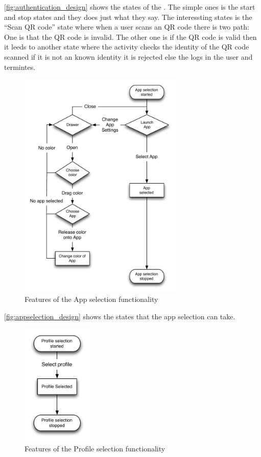 \autoref{fig:authentication_design} shows the states of the . The simple ones is the start and stop states and they does just what they say. The interessting states is the ``Scan QR code'' state where when a user scans an QR code there is two path: One is that the QR code is invalid. The other one is if the QR code is valid then it leeds to another state where the activity checks the identity of the QR code scanned if it is not an known identity it is rejected else the  logs in the user and termintes.

\begin{figure}[h]
	\centering
	\includegraphics[width=0.7\textwidth]{gfx/appselection.pdf}
	\caption{Features of the App selection functionality}
	\label{fig:appselection_design}
\end{figure}

\autoref{fig:appselection_design} shows the states that the app selection can take. 

\begin{figure}[h]
	\centering
	\includegraphics[width=0.3\textwidth]{gfx/profileselect_design.pdf}
	\caption{Features of the Profile selection functionality}
	\label{fig:profileselection_design}
\end{figure}

